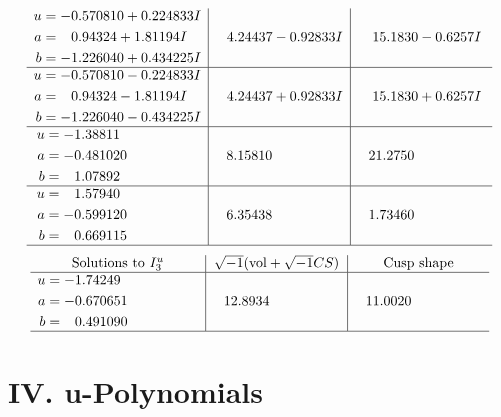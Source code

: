 \documentclass[1p]{elsarticle_modified}
\theoremstyle{definition}
\newcommand{\I}{\sqrt{-1}}
\begin{document}
$$\begin{array}{c|c|c}
\begin{aligned}
u &= -0.570810 + 0.224833 I \\
a &= \phantom{-}0.94324 + 1.81194 I \\
b &= -1.226040 + 0.434225 I\end{aligned}
 & \phantom{-}4.24437 - 0.92833 I & \phantom{-}15.1830 - 0.6257 I \\ \hline\begin{aligned}
u &= -0.570810 - 0.224833 I \\
a &= \phantom{-}0.94324 - 1.81194 I \\
b &= -1.226040 - 0.434225 I\end{aligned}
 & \phantom{-}4.24437 + 0.92833 I & \phantom{-}15.1830 + 0.6257 I \\ \hline\begin{aligned}
u &= -1.38811\phantom{ +0.000000I} \\
a &= -0.481020\phantom{ +0.000000I} \\
b &= \phantom{-}1.07892\phantom{ +0.000000I}\end{aligned}
 & \phantom{-}8.15810\phantom{ +0.000000I} & \phantom{-}21.2750\phantom{ +0.000000I} \\ \hline\begin{aligned}
u &= \phantom{-}1.57940\phantom{ +0.000000I} \\
a &= -0.599120\phantom{ +0.000000I} \\
b &= \phantom{-}0.669115\phantom{ +0.000000I}\end{aligned}
 & \phantom{-}6.35438\phantom{ +0.000000I} & \phantom{-}1.73460\phantom{ +0.000000I}\\
 \hline 
 \end{array}$$\newpage$$\begin{array}{c|c|c}  
\text{Solutions to }I^u_{3}& \I (\text{vol} + \sqrt{-1}CS) & \text{Cusp shape}\\
 \hline 
\begin{aligned}
u &= -1.74249\phantom{ +0.000000I} \\
a &= -0.670651\phantom{ +0.000000I} \\
b &= \phantom{-}0.491090\phantom{ +0.000000I}\end{aligned}
 & \phantom{-}12.8934\phantom{ +0.000000I} & \phantom{-}11.0020\phantom{ +0.000000I}\\
 \hline 
 \end{array}$$\newpage
\newpage\renewcommand{\arraystretch}{1}
\centering \section*{ IV. u-Polynomials}
\end{document}
